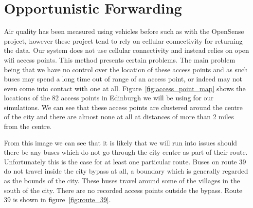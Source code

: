     \section{Opportunistic Forwarding}\label{data_gathering_performance_opportunistic_forwarding}


        Air quality has been measured using vehicles before such as with the OpenSense project, however these project tend to rely on cellular connectivity for returning the data. Our system does not use cellular connectivity and instead relies on open wifi access points. This method presents certain problems. The main problem being that we have no control over the location of these access points and as such buses may spend a long time out of range of an access point, or indeed may not even come into contact with one at all. Figure~\ref{fig:access_point_map} shows the locations of the 82 access points in Edinburgh we will be using for our simulations. We can see that these access points are clustered around the centre of the city and there are almost none at all at distances of more than 2 miles from the centre. 


        From this image we can see that it is likely that we will run into issues should there be any buses which do not go through the city centre as part of their route. Unfortunately this is the case for at least one particular route. Buses on route 39 do not travel inside the city bypass at all, a boundary which is generally regarded as the bounds of the city. These buses travel around some of the villages in the south of the city. There are no recorded access points outside the bypass. Route 39 is shown in figure~\ref{fig:route_39}.


